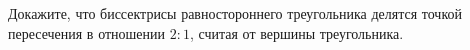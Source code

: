 \begin{ex}
	\begin{condition}
		Докажите, что биссектрисы равностороннего треугольника делятся точкой пересечения в отношении \( 2 : 1 \), считая от вершины треугольника.
	\end{condition}
\end{ex}